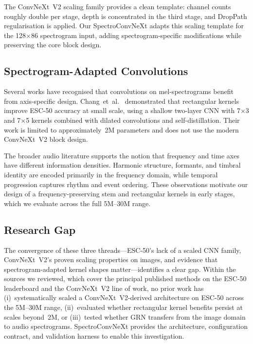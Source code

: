 \documentclass{article}
\begin{document}
The ConvNeXt~V2 scaling family provides a clean template: channel counts roughly
double per stage, depth is concentrated in the third stage, and DropPath
regularisation is applied. Our SpectroConvNeXt adapts this scaling template for
the 128$\times$86 spectrogram input, adding spectrogram-specific modifications
while preserving the core block design.

\subsection{Spectrogram-Adapted Convolutions}

Several works have recognised that convolutions on mel-spectrograms benefit
from axis-specific design. Chang~et~al.~\cite{chang2026rectangular}
demonstrated that rectangular kernels improve ESC-50 accuracy at small scale,
using a shallow two-layer CNN with 7$\times$3 and 7$\times$5 kernels combined
with dilated convolutions and self-distillation. Their work is limited to
approximately~2M parameters and does not use the modern ConvNeXt~V2 block
design.

The broader audio literature supports the notion that frequency and time axes
have different information densities. Harmonic structure, formants, and timbral
identity are encoded primarily in the frequency domain, while temporal
progression captures rhythm and event ordering. These observations motivate our
design of a frequency-preserving stem and rectangular kernels in early stages,
which we evaluate across the full 5M--30M range.

\subsection{Research Gap}

The convergence of these three threads---ESC-50's lack of a scaled CNN family,
ConvNeXt~V2's proven scaling properties on images, and evidence that
spectrogram-adapted kernel shapes matter---identifies a clear gap. Within the
sources we reviewed, which cover the principal published methods on the ESC-50
leaderboard and the ConvNeXt~V2 line of work, no prior work has (i)~systematically
scaled a ConvNeXt~V2-derived architecture on ESC-50 across the 5M--30M range,
(ii)~evaluated whether rectangular kernel benefits persist at scales beyond~2M,
or (iii)~tested whether GRN transfers from the image domain to audio
spectrograms. SpectroConvNeXt provides the architecture, configuration contract,
and validation harness to enable this investigation.
\end{document}
